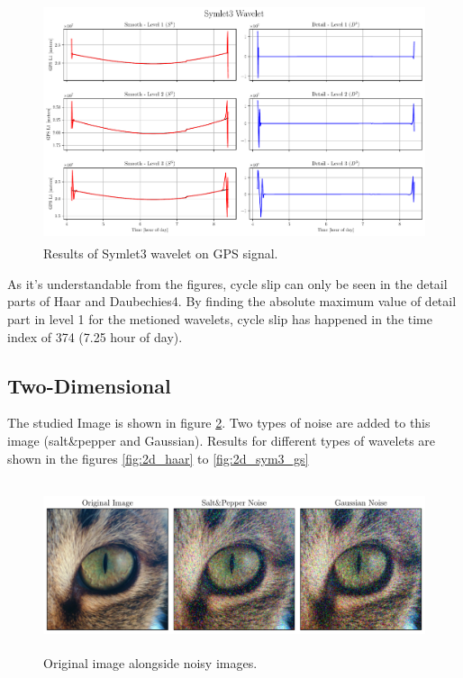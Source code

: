 \documentclass[12pt]{article}
\begin{document}
	\begin{figure}[!h]
		\centering
		\includegraphics[height=7cm]{../Tests/Outputs/CycleSlip_Symlet3.pdf}
		\caption{Results of Symlet3 wavelet on GPS signal.}
		\label{fig:cs_sym3}
	\end{figure}
	\clearpage
	
	As it's understandable from the figures, cycle slip can only be seen in the detail parts of Haar and Daubechies4. By finding the absolute maximum value of detail part in level 1 for the metioned wavelets, cycle slip has happened in the time index of 374 (7.25 hour of day).
	
	\subsection{Two-Dimensional}
	
	The studied Image is shown in figure \ref{fig:2d_image}. Two types of noise are added to this image (salt\&pepper and Gaussian). Results for different types of wavelets are shown in the figures \ref{fig:2d_haar} to \ref{fig:2d_sym3_gs}
	
	\begin{figure}[!h]
		\centering
		\includegraphics[height=5cm]{../Tests/Outputs/2D_Image.pdf}
		\caption{Original image alongside noisy images.}
		\label{fig:2d_image}
	\end{figure}
\end{document}
